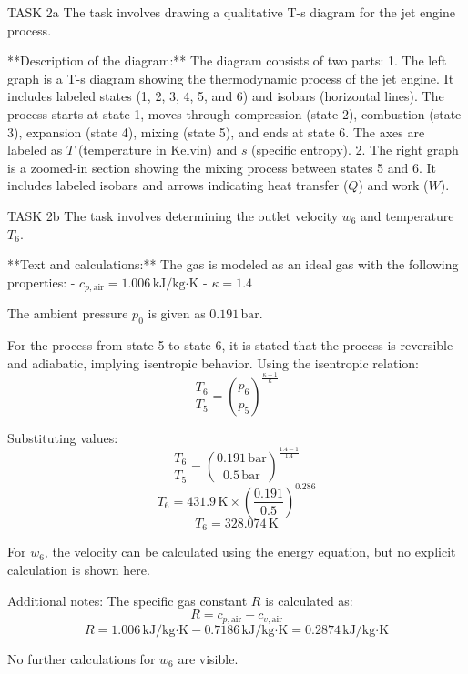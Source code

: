 TASK 2a  
The task involves drawing a qualitative T-s diagram for the jet engine process.  

**Description of the diagram:**  
The diagram consists of two parts:  
1. The left graph is a T-s diagram showing the thermodynamic process of the jet engine. It includes labeled states (1, 2, 3, 4, 5, and 6) and isobars (horizontal lines). The process starts at state 1, moves through compression (state 2), combustion (state 3), expansion (state 4), mixing (state 5), and ends at state 6. The axes are labeled as \( T \) (temperature in Kelvin) and \( s \) (specific entropy).  
2. The right graph is a zoomed-in section showing the mixing process between states 5 and 6. It includes labeled isobars and arrows indicating heat transfer (\( \dot{Q} \)) and work (\( \dot{W} \)).  

TASK 2b  
The task involves determining the outlet velocity \( w_6 \) and temperature \( T_6 \).  

**Text and calculations:**  
The gas is modeled as an ideal gas with the following properties:  
- \( c_{p,\text{air}} = 1.006 \, \text{kJ/kg·K} \)  
- \( \kappa = 1.4 \)  

The ambient pressure \( p_0 \) is given as \( 0.191 \, \text{bar} \).  

For the process from state 5 to state 6, it is stated that the process is reversible and adiabatic, implying isentropic behavior. Using the isentropic relation:  
\[
\frac{T_6}{T_5} = \left( \frac{p_6}{p_5} \right)^{\frac{\kappa - 1}{\kappa}}
\]  

Substituting values:  
\[
\frac{T_6}{T_5} = \left( \frac{0.191 \, \text{bar}}{0.5 \, \text{bar}} \right)^{\frac{1.4 - 1}{1.4}}
\]  
\[
T_6 = 431.9 \, \text{K} \times \left( \frac{0.191}{0.5} \right)^{0.286}
\]  
\[
T_6 = 328.074 \, \text{K}
\]  

For \( w_6 \), the velocity can be calculated using the energy equation, but no explicit calculation is shown here.  

Additional notes:  
The specific gas constant \( R \) is calculated as:  
\[
R = c_{p,\text{air}} - c_{v,\text{air}}
\]  
\[
R = 1.006 \, \text{kJ/kg·K} - 0.7186 \, \text{kJ/kg·K} = 0.2874 \, \text{kJ/kg·K}
\]  

No further calculations for \( w_6 \) are visible.